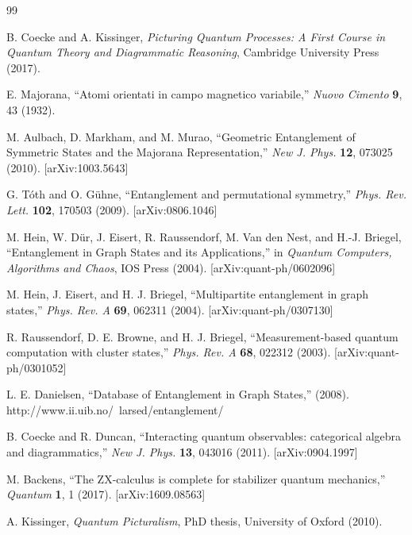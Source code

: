 \documentclass[12pt,a4paper]{article}
\begin{document}
\begin{thebibliography}{99}

	 B. Coecke and A. Kissinger, \textit{Picturing Quantum Processes: A First Course in Quantum Theory and Diagrammatic Reasoning}, Cambridge University Press (2017).

	 E. Majorana, ``Atomi orientati in campo magnetico variabile,'' \textit{Nuovo Cimento} \textbf{9}, 43 (1932).

	 M. Aulbach, D. Markham, and M. Murao, ``Geometric Entanglement of Symmetric States and the Majorana Representation,'' \textit{New J. Phys.} \textbf{12}, 073025 (2010). [arXiv:1003.5643]

	 G. Tóth and O. Gühne, ``Entanglement and permutational symmetry,'' \textit{Phys. Rev. Lett.} \textbf{102}, 170503 (2009). [arXiv:0806.1046]

	 M. Hein, W. Dür, J. Eisert, R. Raussendorf, M. Van den Nest, and H.-J. Briegel, ``Entanglement in Graph States and its Applications,'' in \textit{Quantum Computers, Algorithms and Chaos}, IOS Press (2004). [arXiv:quant-ph/0602096]

	 M. Hein, J. Eisert, and H. J. Briegel, ``Multipartite entanglement in graph states,'' \textit{Phys. Rev. A} \textbf{69}, 062311 (2004). [arXiv:quant-ph/0307130]

	 R. Raussendorf, D. E. Browne, and H. J. Briegel, ``Measurement-based quantum computation with cluster states,'' \textit{Phys. Rev. A} \textbf{68}, 022312 (2003). [arXiv:quant-ph/0301052]

	 L. E. Danielsen, ``Database of Entanglement in Graph States,'' (2008). http://www.ii.uib.no/~larsed/entanglement/

	 B. Coecke and R. Duncan, ``Interacting quantum observables: categorical algebra and diagrammatics,'' \textit{New J. Phys.} \textbf{13}, 043016 (2011). [arXiv:0904.1997]

	 M. Backens, ``The ZX-calculus is complete for stabilizer quantum mechanics,'' \textit{Quantum} \textbf{1}, 1 (2017). [arXiv:1609.08563]

	 A. Kissinger, \textit{Quantum Picturalism}, PhD thesis, University of Oxford (2010).


\end{thebibliography}
\end{document}
